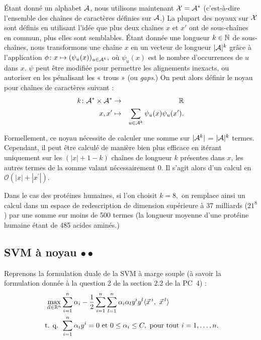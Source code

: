 Étant donné un alphabet $\mathcal{A}$, nous utilisons maintenant $\mathcal{X} = \mathcal{A}^*$
(c'est-à-dire l'ensemble des chaînes de caractères définies sur $\mathcal{A}$.) La
plupart des noyaux sur $\mathcal{X}$ sont définis en utilisant l'idée que plus deux
chaînes $x$ et $x'$ ont de sous-chaînes en commun, plus elles sont semblables.
Étant donnée une longueur $k \in \mathbb{N}$ de sous-chaînes, nous transformons une
chaîne $x$ en un vecteur de longueur $|\mathcal{A}|^k$ grâce à l'application
$\phi\colon x \mapsto (\psi_u(x))_{u \in \mathcal{A}^k},$ où $\psi_u(x)$ est le nombre
d'occurrences de $u$ dans $x$. $\psi$ peut être modifiée pour permettre les
alignements inexacts, ou autoriser en les pénalisant les « trous » (ou {\it
  gaps}.)
On peut alors définir le noyau pour chaînes de caractères suivant :
\begin{eqnarray*}
  k \colon \mathcal{A}^* \times \mathcal{A}^* & \to & \mathbb{R} \\
  x, x^\prime & \mapsto & \sum_{u \in \mathcal{A}^k} \psi_u(x) \psi_u(x^\prime).
\end{eqnarray*}

Formellement, ce noyau nécessite de calculer une somme sur $|\mathcal{A}^k|$ =
$|\mathcal{A}|^k$ termes. Cependant, il peut être calculé de manière bien plus
efficace en itérant uniquement sur les $(|x|+1-k)$ chaînes de longueur $k$
présentes dans $x$, les autres termes de la somme valant nécessairement 0. Il
s'agit alors d'un calcul en $\mathcal{O}(|x| +|x^\prime|)$.

Dans le cas des protéines humaines, si l'on choisit $k=8,$ on remplace
ainsi un calcul dans un espace de redescription de dimension supérieure à
37 milliards ($21^8$) par une somme sur moins de 500 termes (la longueur
moyenne d'une protéine humaine étant de 485 acides aminés.)

\subsection{SVM à noyau $\bullet \bullet$}
\label{sec:kernel_svm}
Reprenons la formulation duale de la SVM à marge souple (à savoir la
formulation donnée à la question 2 de la section 2.2 de la PC~4) :
\begin{align}
  \label{eq:soft-margin-dual-pb}
  \max_{\aalpha \in \RR^n} & 
                           \sum_{i=1}^n  \alpha_i- 
                           \frac{1}{2} \sum_{i=1}^n \sum_{l=1}^n \alpha_i \alpha_l y^i y^l \innerproduct{\xx^i,~\xx^l} \\
  \nonumber \text{ t. q. } & \sum_{i=1}^n \alpha_i y^i = 0 \text{ et }  0 \leq \alpha_i
                             \leq C, \text{ pour tout } i=1, \dots, n.
\end{align}

